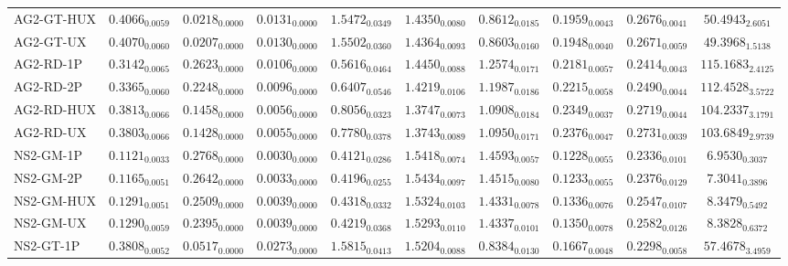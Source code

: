 \begin{longtable}{@{}lccccccccc@{}}
AG2-GT-HUX & $\mathbf{0.4066}_{0.0059}$ & $\mathbf{0.0218}_{0.0000}$ & $0.0131_{0.0000}$ & $1.5472_{0.0349}$ & $1.4350_{0.0080}$ & $0.8612_{0.0185}$ & $0.1959_{0.0043}$ & $0.2676_{0.0041}$ & $50.4943_{2.6051}$ \\
AG2-GT-UX & $\mathbf{0.4070}_{0.0060}$ & $\mathbf{0.0207}_{0.0000}$ & $0.0130_{0.0000}$ & $1.5502_{0.0360}$ & $1.4364_{0.0093}$ & $0.8603_{0.0160}$ & $0.1948_{0.0040}$ & $0.2671_{0.0059}$ & $49.3968_{1.5138}$ \\
AG2-RD-1P & $0.3142_{0.0065}$ & $0.2623_{0.0000}$ & $0.0106_{0.0000}$ & $0.5616_{0.0464}$ & $1.4450_{0.0088}$ & $1.2574_{0.0171}$ & $0.2181_{0.0057}$ & $0.2414_{0.0043}$ & $\mathbf{115.1683}_{2.4125}$ \\
AG2-RD-2P & $0.3365_{0.0060}$ & $0.2248_{0.0000}$ & $0.0096_{0.0000}$ & $0.6407_{0.0546}$ & $1.4219_{0.0106}$ & $1.1987_{0.0186}$ & $0.2215_{0.0058}$ & $0.2490_{0.0044}$ & $\mathbf{112.4528}_{3.5722}$ \\
AG2-RD-HUX & $0.3813_{0.0066}$ & $0.1458_{0.0000}$ & $0.0056_{0.0000}$ & $0.8056_{0.0323}$ & $\mathbf{1.3747}_{0.0073}$ & $1.0908_{0.0184}$ & $0.2349_{0.0037}$ & $0.2719_{0.0044}$ & $104.2337_{3.1791}$ \\
AG2-RD-UX & $0.3803_{0.0066}$ & $0.1428_{0.0000}$ & $0.0055_{0.0000}$ & $0.7780_{0.0378}$ & $\mathbf{1.3743}_{0.0089}$ & $1.0950_{0.0171}$ & $0.2376_{0.0047}$ & $0.2731_{0.0039}$ & $103.6849_{2.9739}$ \\
NS2-GM-1P & $0.1121_{0.0033}$ & $0.2768_{0.0000}$ & $0.0030_{0.0000}$ & $0.4121_{0.0286}$ & $1.5418_{0.0074}$ & $1.4593_{0.0057}$ & $0.1228_{0.0055}$ & $0.2336_{0.0101}$ & $6.9530_{0.3037}$ \\
NS2-GM-2P & $0.1165_{0.0051}$ & $0.2642_{0.0000}$ & $0.0033_{0.0000}$ & $0.4196_{0.0255}$ & $1.5434_{0.0097}$ & $1.4515_{0.0080}$ & $0.1233_{0.0055}$ & $0.2376_{0.0129}$ & $7.3041_{0.3896}$ \\
NS2-GM-HUX & $0.1291_{0.0051}$ & $0.2509_{0.0000}$ & $0.0039_{0.0000}$ & $0.4318_{0.0332}$ & $1.5324_{0.0103}$ & $1.4331_{0.0078}$ & $0.1336_{0.0076}$ & $0.2547_{0.0107}$ & $8.3479_{0.5492}$ \\
NS2-GM-UX & $0.1290_{0.0059}$ & $0.2395_{0.0000}$ & $0.0039_{0.0000}$ & $0.4219_{0.0368}$ & $1.5293_{0.0110}$ & $1.4337_{0.0101}$ & $0.1350_{0.0078}$ & $0.2582_{0.0126}$ & $8.3828_{0.6372}$ \\
NS2-GT-1P & $0.3808_{0.0052}$ & $0.0517_{0.0000}$ & $0.0273_{0.0000}$ & $\mathbf{1.5815}_{0.0413}$ & $1.5204_{0.0088}$ & $\mathbf{0.8384}_{0.0130}$ & $0.1667_{0.0048}$ & $0.2298_{0.0058}$ & $57.4678_{3.4959}$ \\

\end{longtable}
